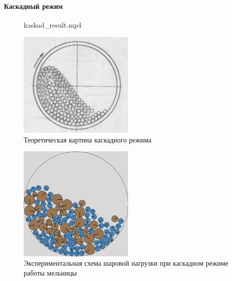 \documentclass[c]{beamer}  %
\begin{document}
\begin{frame}
\frametitle{\insertsection} 
\framesubtitle{Каскадный режим}
	\begin{figure}[ht]
     		{kaskad_result.mp4}
\end{figure}
{
\begin{figure}[H]
	\centering
	\includegraphics[width=0.5\textwidth]{kaskad_theory} 
	\caption{Теоретическая картина каскадного режима}
\end{figure}
}
{
\begin{figure}[H]
	\centering
	\includegraphics[width=0.5\textwidth]{kaskad_result} 
	\caption{Экспериментальная схема шаровой нагрузки при каскадном режиме работы мельницы}
	\label{pic:kaskad_result}
\end{figure} 
}
{

}
\end{frame}
\end{document}
